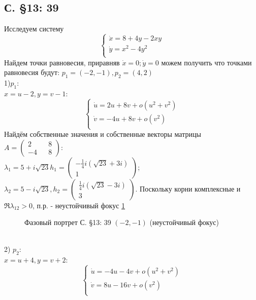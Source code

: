 \documentclass{article}
\begin{document}
\subsection{С. \S13: 39}
Исследуем систему 
\begin{equation}
\begin{cases}
        \dot{x}=8+4y-2xy\\
        \dot{y}=x^2-4y^2\\
    \end{cases}    
\end{equation}
Найдем точки равновесия, приравняв $\dot{x}=0; \dot{y}=0$ можем получить что точками равновесия будут: $p_1=(-2,-1), p_2=(4,2)$\\

1)$p_1$:\\
$x=u-2,y=v-1$:
\begin{equation}
\begin{cases}
        \dot{u}=2u+8v+o(u^2+v^2)\\
        \dot{v}=-4u+8v+o(v^2)\\
    \end{cases}    
\end{equation}
Найдём собственные значения и собственные векторы матрицы $A=\begin{pmatrix} 2 && 8 \\ -4 && 8 \end{pmatrix}$:\\
 $\lambda_1=5+i \sqrt{23}
 h_1 = \begin{pmatrix} -\frac{1}{4} i \left(\sqrt{23}+3 i\right) \\  1 \end{pmatrix} $; 
 $\lambda_2= 5-i \sqrt{23},
 h_2 = \begin{pmatrix} \frac{1}{4} i \left(\sqrt{23}-3 i\right)  \\  3 \end{pmatrix} $. 
 Поскольку корни комплексные и $\Re \lambda_{12}>0$, п.р. - неустойчивый фокус \ref{13.39.1}
 \begin{figure}[ht]
\caption{Фазовый портрет С. \S13: 39 $(-2,-1)$ (неустойчивый фокус)}
\label{13.39.1}
\end{figure}\\  
2) $p_2$:\\
$x=u+4,y=v+2$:
\begin{equation}
\begin{cases}
        \dot{u}=-4u-4v+o(u^2+v^2)\\
        \dot{v}=8u-16v+o(v^2)\\
    \end{cases}    
\end{equation}
\end{document}
